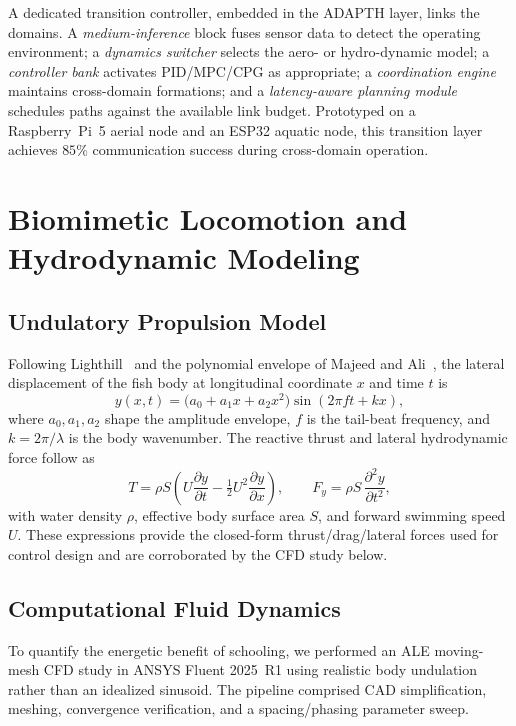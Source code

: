 \documentclass[journal]{IEEEtran}
\begin{document}
A dedicated transition controller, embedded in the ADAPTH layer, links the
domains. A \emph{medium-inference} block fuses sensor data to detect the operating
environment; a \emph{dynamics switcher} selects the aero- or hydro-dynamic model;
a \emph{controller bank} activates PID/MPC/CPG as appropriate; a
\emph{coordination engine} maintains cross-domain formations; and a
\emph{latency-aware planning module} schedules paths against the available link
budget. Prototyped on a Raspberry~Pi~5 aerial node and an ESP32 aquatic node, this
transition layer achieves $85\%$ communication success during cross-domain
operation.

\section{Biomimetic Locomotion and Hydrodynamic Modeling}
\label{sec:locomotion}

\subsection{Undulatory Propulsion Model}
Following Lighthill~\cite{lighthill1971large} and the polynomial envelope of
Majeed and Ali~\cite{majeed2014dynamic}, the lateral displacement of the fish
body at longitudinal coordinate $x$ and time $t$ is
\begin{equation}
y(x,t) = \big(a_0 + a_1 x + a_2 x^2\big)\sin(2\pi f t + k x),
\label{eq:bodywave}
\end{equation}
where $a_0,a_1,a_2$ shape the amplitude envelope, $f$ is the tail-beat
frequency, and $k=2\pi/\lambda$ is the body wavenumber. The reactive thrust and
lateral hydrodynamic force follow as
\begin{equation}
T = \rho S\!\left(U\frac{\partial y}{\partial t}
   - \tfrac{1}{2}U^2\frac{\partial y}{\partial x}\right),
\qquad
F_y = \rho S\,\frac{\partial^2 y}{\partial t^2},
\label{eq:thrust}
\end{equation}
with water density $\rho$, effective body surface area $S$, and forward
swimming speed $U$. These expressions provide the closed-form thrust/drag/lateral
forces used for control design and are corroborated by the CFD study below.

\subsection{Computational Fluid Dynamics}
To quantify the energetic benefit of schooling, we performed an ALE moving-mesh
CFD study in ANSYS Fluent 2025~R1 using realistic body undulation rather than an
idealized sinusoid. The pipeline comprised CAD simplification, meshing,
convergence verification, and a spacing/phasing parameter sweep.
\end{document}
